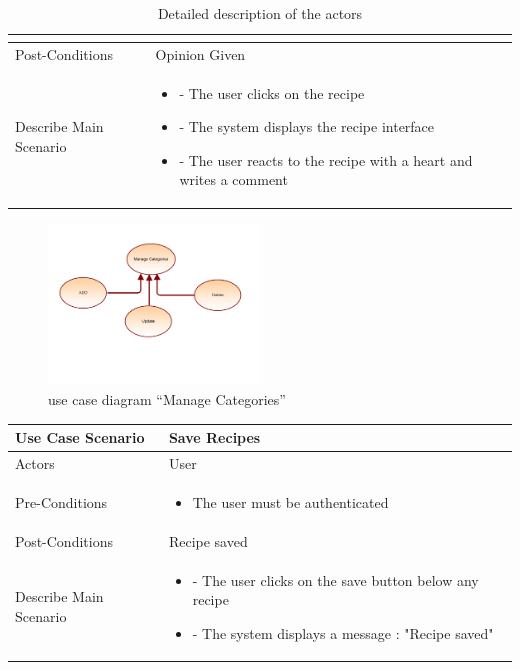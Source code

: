 \documentclass{article}
\begin{document}
{{{\begin{table}[h]
\begin{tabularx}{\textwidth}{X|X}
\begin{itemize}[label=$\bullet$]
        \end{itemize} \\
        \midrule
        Post-Conditions & Opinion Given  \\
        \midrule
        Describe Main Scenario &  \begin{itemize}[label=$\bullet$]
            \item - The user clicks on the recipe
            \item- The system displays the recipe interface
	\item- The user reacts to the recipe with a heart and writes a comment
           
        \end{itemize} \\
        \bottomrule
    \end{tabularx}
    \caption{Detailed description of the actors}
    \label{tab:actors_roles}
\end{table}
\newpage


\begin{figure}[htbp]
    \centering
    \includegraphics[width=0.5\textwidth]{Manage}
    \caption{use case diagram “Manage Categories”}
    \label{fig:design2}
\end{figure}
\begin{table}[h]
    \centering
    \begin{tabularx}{\textwidth}{X|X}
        \toprule
        Use Case Scenario & Save Recipes\\
        \midrule
        Actors & User \\
        \midrule
        Pre-Conditions & \begin{itemize}[label=$\bullet$]
            \item The user must be authenticated
           
        \end{itemize} \\
        \midrule
        Post-Conditions & Recipe saved  \\
        \midrule
        Describe Main Scenario &  \begin{itemize}[label=$\bullet$]
            \item - The user clicks on the save button below any recipe
            \item- The system displays a message : "Recipe saved"
	

\end{itemize}
\end{tabularx}
\end{table}}}}
\end{document}
